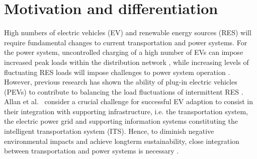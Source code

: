\section{Motivation and differentiation}



High numbers of electric vehicles (EV) and renewable energy sources (RES) will require fundamental changes to current transportation and power systems. 
For the power system, uncontrolled charging of a high number of EVs can impose increased peak loads within the distribution network \cite{lopes2009identifying}, while increasing levels of fluctuating RES loads will impose challenges to power system operation \cite{heussen2012unified}. 
However, previous research has shown the ability of plug-in electric vehicles (PEVs) to contribute to balancing the load fluctuations of intermittent RES \cite{dallinger2012grid}. 
Allan et al.~\cite{allan2015benchmark} consider a crucial challenge for successful EV adaption to consist in their integration with supporting infrastructure, i.e. the transportation system, the electric power grid and supporting information systems constituting the intelligent transportation system (ITS). 
Hence, to diminish negative environmental impacts and achieve longterm sustainability, close integration between transportation and power systems is necessary \cite{amro2016need}.

